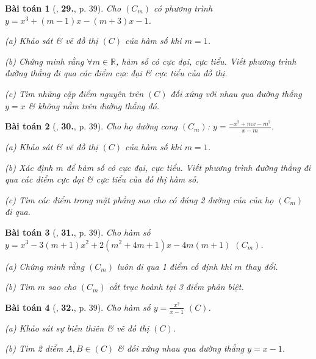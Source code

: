 \documentclass[12pt]{article}
\numberwithin{equation}{section}
\newtheorem{baitoan}{Bài toán}[section]
\begin{document}
\begin{baitoan}[\cite{TL_chuyen_Toan_Giai_Tich_12}, \textbf{29.}, p. 39]
	Cho $(C_m)$ có phương trình $y = x^3 + (m - 1)x - (m + 3)x - 1$.
	\begin{enumerate*}
		\item[(a)] Khảo sát \& vẽ đồ thị $(C)$ của hàm số khi $m = 1$.
		\item[(b)] Chứng minh rằng $\forall m\in\mathbb{R}$, hàm số có cực đại, cực tiểu. Viết phương trình đường thẳng đi qua các điểm cực đại \& cực tiểu của đồ thị.
		\item[(c)] Tìm những cặp điểm nguyên trên $(C)$ đối xứng với nhau qua đường thẳng $y = x$ \& không nằm trên đường thẳng đó.
	\end{enumerate*}
\end{baitoan}

\begin{baitoan}[\cite{TL_chuyen_Toan_Giai_Tich_12}, \textbf{30.}, p. 39]
	Cho họ đường cong $(C_m)$: $y = \frac{-x^2 + mx - m^2}{x - m}$.
	\begin{enumerate*}
		\item[(a)] Khảo sát \& vẽ đồ thị $(C)$ của hàm số khi $m = 1$.
		\item[(b)] Xác định $m$ để hàm số có cực đại, cực tiểu. Viết phương trình đường thẳng đi qua các điểm cực đại \& cực tiểu của đồ thị hàm số.
		\item[(c)] Tìm các điểm trong mặt phẳng sao cho có đúng 2 đường của của họ $(C_m)$ đi qua.
	\end{enumerate*}
\end{baitoan}

\begin{baitoan}[\cite{TL_chuyen_Toan_Giai_Tich_12}, \textbf{31.}, p. 39]
	Cho hàm số $y = x^3 - 3(m + 1)x^2 + 2(m^2 + 4m + 1)x - 4m(m + 1)$ $(C_m)$.
	\begin{enumerate*}
		\item[(a)] Chứng minh rằng $(C_m)$ luôn đi qua 1 điểm cố định khi $m$ thay đổi.
		\item[(b)] Tìm $m$ sao cho $(C_m)$ cắt trục hoành tại 3 điểm phân biệt.
	\end{enumerate*}
\end{baitoan}

\begin{baitoan}[\cite{TL_chuyen_Toan_Giai_Tich_12}, \textbf{32.}, p. 39]
	Cho hàm số $y = \frac{x^2}{x - 1}$ $(C)$.
	\begin{enumerate*}
		\item[(a)] Khảo sát sự biến thiên \& vẽ đồ thị $(C)$.
		\item[(b)] Tìm 2 điểm $A,B\in(C)$ \& đối xứng nhau qua đường thẳng $y = x - 1$.
	\end{enumerate*}
\end{baitoan}
\end{document}
